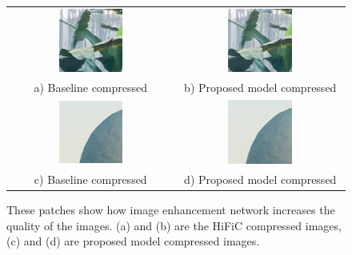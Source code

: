 \begin{figure}[!ht]
    \centering
    \begin{tabular}{cc}
        \includegraphics[width=0.4\textwidth]{figure/jungle-recon.png} & \includegraphics[width=0.4\textwidth]{figure/jungle-recon-denoise.png} \\
        a) Baseline compressed                                         & b) Proposed model compressed                                           \\
        \includegraphics[width=0.4\textwidth]{figure/sky-recon.png}    & \includegraphics[width=0.4\textwidth]{figure/sky-recon-denoise.png}    \\
        c) Baseline compressed                                         & d) Proposed model compressed
    \end{tabular}
    \caption[Patches from images.]{These patches show how image enhancement network increases the quality of the images. (a) and (b) are the HiFiC compressed images, (c) and (d) are proposed model compressed images.}
    \label{patches}
\end{figure}

